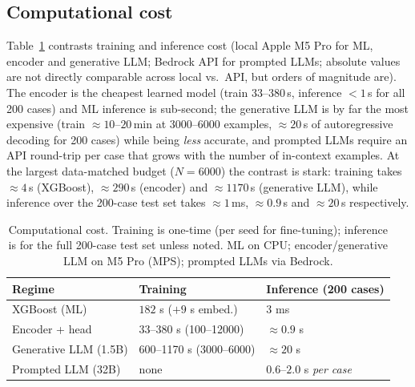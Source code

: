 \documentclass[kdmile,a4paper]{kdmile}
\begin{document}
\subsection{Computational cost}
Table~\ref{tab:cost} contrasts training and inference cost (local Apple M5 Pro for ML, encoder and generative LLM; Bedrock API for prompted LLMs; absolute values are not directly comparable across local vs.\ API, but orders of magnitude are). The encoder is the cheapest learned model (train $33$--$380$\,s, inference $<\!1$\,s for all 200 cases) and ML inference is sub-second; the generative LLM is by far the most expensive (train $\approx\!10$--$20$\,min at $3000$--$6000$ examples, $\approx\!20$\,s of autoregressive decoding for 200 cases) while being \emph{less} accurate, and prompted LLMs require an API round-trip per case that grows with the number of in-context examples. At the largest data-matched budget ($N{=}6000$) the contrast is stark: training takes $\approx\!4$\,s (XGBoost), $\approx\!290$\,s (encoder) and $\approx\!1170$\,s (generative LLM), while inference over the 200-case test set takes $\approx\!1$\,ms, $\approx\!0.9$\,s and $\approx\!20$\,s respectively.

\begin{table}[t]
\centering
\caption{Computational cost. Training is one-time (per seed for fine-tuning); inference is for the full 200-case test set unless noted. ML on CPU; encoder/generative LLM on M5 Pro (MPS); prompted LLMs via Bedrock.}
\label{tab:cost}
\small
\begin{tabular}{@{}lll@{}}
\toprule
Regime & Training & Inference (200 cases) \\
\midrule
XGBoost (ML)           & $182$ s ($+9$ s embed.) & $3$ ms \\
Encoder + head         & 33--380 s (100--12000) & $\approx 0.9$ s \\
Generative LLM (1.5B)  & 600--1170 s (3000--6000) & $\approx 20$ s \\
Prompted LLM (32B)     & none & $0.6$--$2.0$ s \emph{per case} \\
\bottomrule
\end{tabular}
\end{table}
\end{document}
